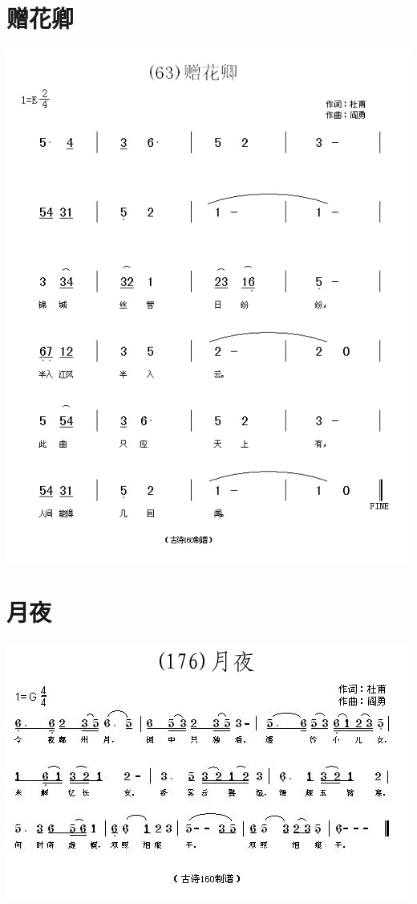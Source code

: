\documentclass[cn,pad,twocol]{elegantbook}
\begin{document}
\section{赠花卿}        \includegraphics[width=\textwidth]{dongxiao/20200808-赠花卿-杜甫.jpg}    
\section{月夜}          \includegraphics[width=\textwidth]{dongxiao/20200808-月夜-杜甫.jpg}                     
\end{document}
